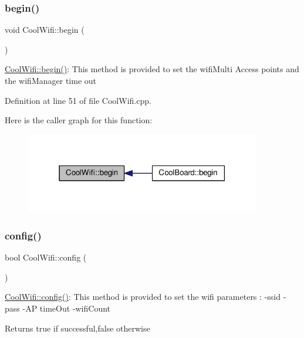 \subsubsection{\texorpdfstring{begin()}{begin()}}
{\footnotesize\ttfamily void Cool\+Wifi\+::begin (\begin{DoxyParamCaption}{ }\end{DoxyParamCaption})}

\hyperlink{class_cool_wifi_a46942fed90e475112cc10b78a32e7aaa}{Cool\+Wifi\+::begin()}\+: This method is provided to set the wifi\+Multi Access points and the wifi\+Manager time out 

Definition at line 51 of file Cool\+Wifi.\+cpp.

Here is the caller graph for this function\+:
\nopagebreak
\begin{figure}[H]
\begin{center}
\leavevmode
\includegraphics[width=291pt]{class_cool_wifi_a46942fed90e475112cc10b78a32e7aaa_icgraph}
\end{center}
\end{figure}
\mbox{\label{class_cool_wifi_a4eb2f6b9b09dd588964b88b6c70122c0}} 
\subsubsection{\texorpdfstring{config()}{config()}\hspace{0.1cm}{\footnotesize\ttfamily [1/2]}}
{\footnotesize\ttfamily bool Cool\+Wifi\+::config (\begin{DoxyParamCaption}{ }\end{DoxyParamCaption})}

\hyperlink{class_cool_wifi_a4eb2f6b9b09dd588964b88b6c70122c0}{Cool\+Wifi\+::config()}\+: This method is provided to set the wifi parameters \+: -\/ssid -\/pass -\/\+AP time\+Out -\/wifi\+Count

\begin{DoxyReturn}{Returns}
true if successful,false otherwise 
\end{DoxyReturn}


